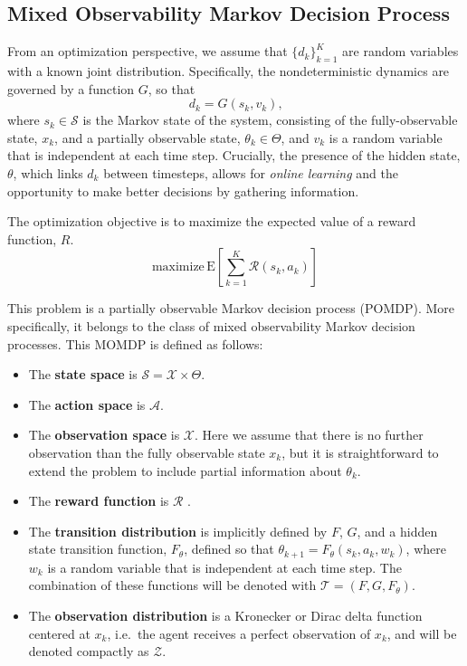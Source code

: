 \documentclass{article}
\newcommand{\sspace}{\ensuremath{\mathcal{S}} }
\newcommand{\aspace}{\ensuremath{\mathcal{A}} }
\newcommand{\tdist}{\ensuremath{\mathcal{T}} }
\newcommand{\odist}{\ensuremath{\mathcal{Z}} }
\newcommand{\reward}{\ensuremath{\mathcal{R}} }
\begin{document}
\subsection{Mixed Observability Markov Decision Process}

From an optimization perspective, we assume that $\{d_k\}_{k=1}^K$ are random variables with a known joint distribution. Specifically, the nondeterministic dynamics are governed by a function $G$, so that
\begin{equation}
    d_k = G(s_k, v_k) \text{,}
\end{equation}
where $s_k \in \sspace$ is the Markov state of the system, consisting of the fully-observable state, $x_k$, and a partially observable state, $\theta_k \in \Theta$, and $v_k$ is a random variable that is independent at each time step.
Crucially, the presence of the hidden state, $\theta$, which links $d_k$ between timesteps, allows for \emph{online learning} and the opportunity to make better decisions by gathering information.

The optimization objective is to maximize the expected value of a reward function, $R$.
\begin{equation}
    \text{maximize}\, \text{E} \left[ \sum_{k=1}^K \reward(s_k, a_k) \right]
    \label{eq:pomdpobj}
\end{equation}

This problem is a partially observable Markov decision process (POMDP).
More specifically, it belongs to the class of mixed observability Markov decision processes.
This MOMDP is defined as follows:

\begin{itemize}
    \item The \textbf{state space} is $\sspace = \mathcal{X} \times \Theta$.
    \item The \textbf{action space} is $\aspace$.
    \item The \textbf{observation space} is $\mathcal{X}$. Here we assume that there is no further observation than the fully observable state $x_k$, but it is straightforward to extend the problem to include partial information about $\theta_k$.
    \item The \textbf{reward function} is \reward.
    \item The \textbf{transition distribution} is implicitly defined by $F$, $G$, and a hidden state transition function, $F_\theta$, defined so that $\theta_{k+1} = F_\theta(s_k, a_k, w_k)$, where $w_k$ is a random variable that is independent at each time step. The combination of these functions will be denoted with $\tdist = (F, G, F_\theta)$.
    \item The \textbf{observation distribution} is a Kronecker or Dirac delta function centered at $x_k$, i.e.\ the agent receives a perfect observation of $x_k$, and will be denoted compactly as $\odist$.
\end{itemize}
\end{document}
